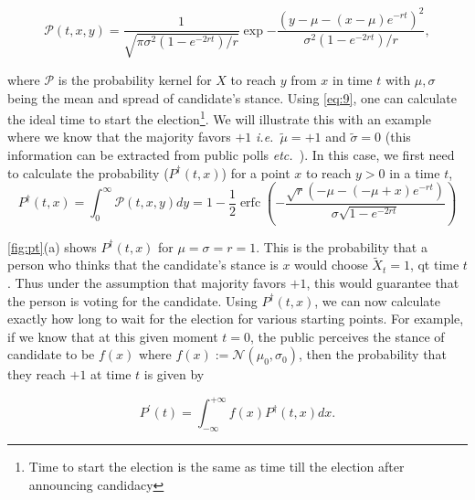 \documentclass[aps,prl,twocolumn,showpacs,final]{revtex4-2}
\newcommand{\ie}{\textit{i.e.\ }}
\newcommand{\etc}{\textit{etc.\ }}
\newcommand\pN{\mathcal{N}}
\begin{document}
\begin{dmath}
\mathcal{P}(t, x, y)=\frac{1}{\sqrt{\pi \sigma^{2}\left(1-e^{-2 r t}\right) / r}} \exp {-\frac{\left(y-\mu-(x-\mu) e^{-r t}\right)^{2}}{\sigma^{2}\left(1-e^{-2 r t}\right) / r} }\label{eq:9},
\end{dmath}

where $\mathcal{P}$ is the probability kernel for $X$ to reach $y$ from $x$ in time $t$ with $\mu,\sigma$ being the mean and spread of candidate's stance. Using \eqref{eq:9}, one can calculate the ideal time to start the election\footnote{Time to start the election is the same as time till the election after announcing candidacy}. We will illustrate this with an example where we know that the majority favors $+1$ \ie $\tilde{\mu}=+1$ and $\tilde{\sigma}=0$ (this information can be extracted from public polls \etc). In this case, we first need to calculate the probability ($P^\dagger(t,x)$) for a point $x$ to reach $y>0$ in a time $t$, 
\begin{dmath}
	P^\dagger(t,x)=\int_0^\infty \mathcal{P}(t,x,y)dy= 1 - \frac{1}{2}\operatorname{erfc}{\left(- \frac{\sqrt{r} \left(- \mu - \left(- \mu + x\right) e^{- r t}\right)}{\sigma \sqrt{1 - e^{- 2 r t}}} \right)}\label{eq:10}
\end{dmath}

\autoref{fig:pt}(a) shows $P^\dagger(t,x)$ for $\mu=\sigma=r=1$. This is the probability that a person who thinks that the candidate's stance is $x$ would choose $\tilde{X}_t=1$, qt time $t$. Thus under the assumption that majority favors $+1$, this would guarantee that the person is voting for the candidate. Using $P^\dagger(t,x)$, we can now calculate exactly how long to wait for the election for various starting points. For example, if we know that at this given moment $t=0$, the public perceives the stance of candidate to be $f(x)$ where $f(x):=\pN(\mu_{0},\sigma_0)$, then the probability that they reach $+1$ at time $t$ is given by

\begin{dmath}
P^\prime(t)=\int_{-\infty}^{+\infty} f(x) P^\dagger(t,x) dx. \label{eq:11}
\end{dmath}
\end{document}
